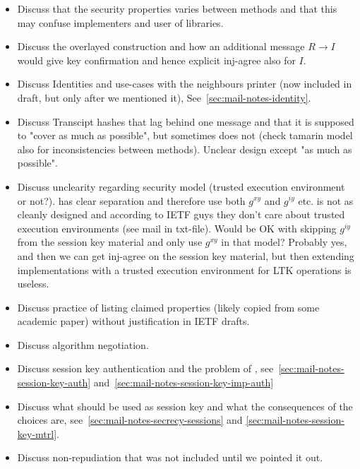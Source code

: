 \documentclass[runningheads]{llncs}
\begin{document}
{\begin{itemize}
\begin{itemize}
            \item Discuss that the security properties varies between methods
                and that this may confuse implementers and user of libraries.
            \item Discuss the overlayed \mOptls construction and how an
                additional \mOscore message $R \rightarrow I$ would give key
                confirmation and hence explicit inj-agree also for $I$.
            \item Discuss Identities and use-cases with the neighbours printer
                (now included in draft, but only after we mentioned it),
                See~\ref{sec:mail-notes-identity}.
            \item Discuss Transcipt hashes that lag behind one message and that
                it is supposed to "cover as much as possible", but sometimes
                does not (check tamarin model also for inconsistencies between
                methods). Unclear design except "as much as possible".
            \item Discuss unclearity regarding security model (trusted execution
                environment or not?). \mOptls has clear separation and therefore
                use both $g^{xy}$ and $g^{iy}$ etc. \mEdhoc is not as cleanly
                designed and according to IETF guys they don't care about
                trusted execution environments (see mail in txt-file).
                Would \mEdhoc be OK with skipping $g^{iy}$ from the session key
                material and only use $g^{xy}$ in that model? Probably yes, and
                then we can get inj-agree on the session key material, but then
                extending \mEdhoc implementations with a trusted execution
                environment for LTK operations is useless.
            \item Discuss practice of listing claimed properties (likely copied
                from some academic paper) without justification in IETF drafts.
            \item Discuss algorithm negotiation.
            \item Discuss session key authentication and the problem of \mGiy,
                see~\ref{sec:mail-notes-session-key-auth}
                and~\ref{sec:mail-notes-session-key-imp-auth}
            \item Discuss what should be used as session key and what the
                consequences of the choices are,
                see~\ref{sec:mail-notes-secrecy-sessions} and
                \ref{sec:mail-notes-session-key-mtrl}.
            \item Discuss non-repudiation that was not included until we pointed
                it out.
        \end{itemize}
\end{itemize}
}
\end{document}
